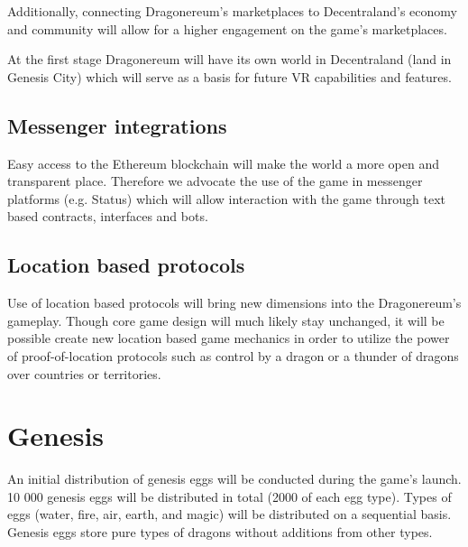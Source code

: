 \documentclass[12pt]{article}
\begin{document}
Additionally, connecting Dragonereum’s marketplaces to Decentraland’s economy and community will allow for a higher engagement on the game’s marketplaces.\par

At the first stage Dragonereum will have its own world in Decentraland (land in Genesis City) which will serve as a basis for future VR capabilities and features.\par


\vspace{\baselineskip}
 \subsection{Messenger integrations}\label{Messenger integrations} \par

Easy access to the Ethereum blockchain will make the world a more open and transparent place. Therefore we advocate the use of the game in messenger platforms (e.g. Status) which will allow interaction with the game through text based contracts, interfaces and bots.\par


\vspace{\baselineskip}
 \subsection{Location based protocols}\label{Location based protocols} \par

Use of location based protocols will bring new dimensions into the Dragonereum’s gameplay. Though core game design will much likely stay unchanged, it will be possible create new location based game mechanics in order to utilize the power of proof-of-location protocols such as control by a dragon or a thunder of dragons over countries or territories.\\



\newpage
\par

\section{Genesis}
 \label{Genesis}  \par

An initial distribution of genesis eggs will be conducted during the game’s launch. 10 000 genesis eggs will be distributed in total (2000 of each egg type). Types of eggs (water, fire, air, earth, and magic) will be distributed on a sequential basis. Genesis eggs store pure types of dragons without additions from other types.\par
\end{document}
